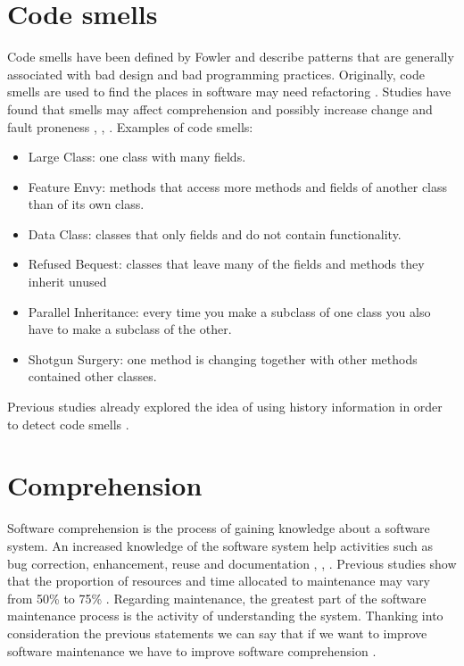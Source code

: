 \documentclass[12pt]{mitthesis}
\begin{document}
\section{Code smells }
Code smells have been defined by Fowler \cite{bookFowler} and describe patterns that are generally associated with bad design and bad programming practices.
Originally, code smells are used to find the places in software may need refactoring \cite{articlesmells}. Studies have found that smells may affect comprehension and possibly increase change and fault proneness \cite{5741260}, \cite{5328703}, \cite{articlefault-proneness}.
Examples of code smells:
\begin{itemize}
	\item Large Class: one class with many fields.
	\item Feature Envy:  methods that access more methods and fields of another class than of its own class.
	\item Data Class: classes that only fields and do not contain functionality.
	\item Refused Bequest: classes that leave many of the fields and methods they inherit unused
	\item Parallel Inheritance: every time you make a subclass of one class you also have to make a subclass of the other.
	\item Shotgun Surgery: one method is changing together with other methods contained other classes.
\end{itemize}

Previous studies already explored the idea of using history information in order to detect code smells \cite{6963448}. 

\section{Comprehension}
Software comprehension is the process of gaining knowledge about a software system.
An increased knowledge of the software system help activities such as bug correction, enhancement, reuse and documentation \cite{Comprehension}, \cite{1199197}, \cite{2003:XLC:851042.857028}.
Previous studies show that the proportion of resources and time allocated to maintenance may vary from 50\% to 75\% \cite{articleLientz}.
Regarding maintenance, the greatest part of the software maintenance process is the activity of understanding the
system. 
Thanking into consideration the previous statements we can say that if we want to improve software maintenance we have to improve software comprehension \cite{article-cognitive-processes}.
\end{document}

